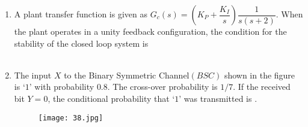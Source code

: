\documentclass[12pt,-letter paper]{article}
\providecommand{\brak}[1]{\ensuremath{\left(#1\right)}}
\theoremstyle{remark}
\begin{document}
\begin{enumerate}
 \item A plant transfer function is given as $G_c\brak{s}=\brak{K_P+\dfrac{K_I}{s}}\dfrac{1}{s\brak{s+2}}$. When the plant operates in a unity feedback configuration, the condition for the stability of the closed loop system is\\ \\
 \item The input $X$ to the Binary Symmetric Channel\brak{BSC} shown in the figure is $‘1’$ with probability $0.8$. The cross-over probability is $1/7$. If the received bit $Y = 0$, the conditional probability that $‘1’$ was 
transmitted is \underline{\hspace{1cm}}.
     \begin{figure}[H]
        \centering
        \texttt{[image: 38.jpg]}
    \end{figure}


\end{enumerate}
\end{document}
